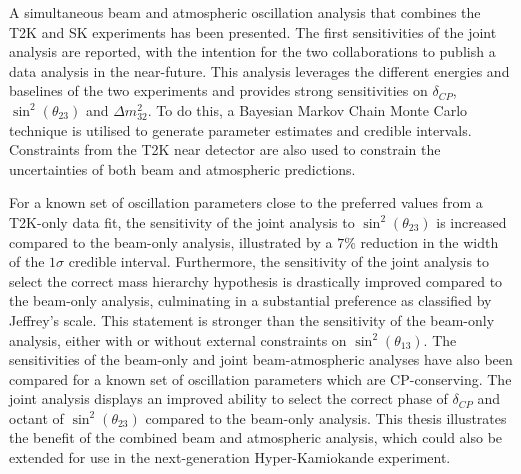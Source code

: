 
A simultaneous beam and atmospheric oscillation analysis that combines the T2K and SK experiments has been presented. The first sensitivities of the joint analysis are reported, with the intention for the two collaborations to publish a data analysis in the near-future. This analysis leverages the different energies and baselines of the two experiments and provides strong sensitivities on $\delta_{CP}$, $\sin^{2}(\theta_{23})$ and $\Delta m^{2}_{32}$. To do this, a Bayesian Markov Chain Monte Carlo technique is utilised to generate parameter estimates and credible intervals. Constraints from the T2K near detector are also used to constrain the uncertainties of both beam and atmospheric predictions.

For a known set of oscillation parameters close to the preferred values from a T2K-only data fit, the sensitivity of the joint analysis to $\sin^{2}(\theta_{23})$ is increased compared to the beam-only analysis, illustrated by a $7\%$ reduction in the width of the $1\sigma$ credible interval. Furthermore, the sensitivity of the joint analysis to select the correct mass hierarchy hypothesis is drastically improved compared to the beam-only analysis, culminating in a substantial preference as classified by Jeffrey's scale. This statement is stronger than the sensitivity of the beam-only analysis, either with or without external constraints on $\sin^{2}(\theta_{13})$. The sensitivities of the beam-only and joint beam-atmospheric analyses have also been compared for a known set of oscillation parameters which are CP-conserving. The joint analysis displays an improved ability to select the correct phase of $\delta_{CP}$ and octant of $\sin^{2}(\theta_{23})$ compared to the beam-only analysis. This thesis illustrates the benefit of the combined beam and atmospheric analysis, which could also be extended for use in the next-generation Hyper-Kamiokande experiment.
